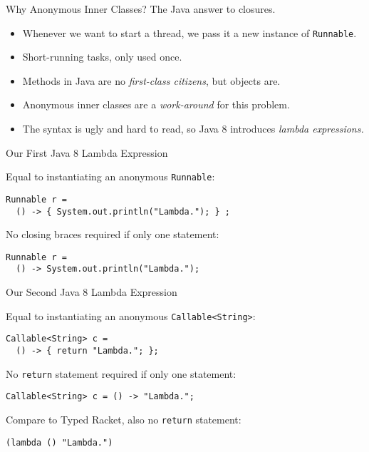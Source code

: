 \documentclass{beamer}
\begin{document}
\begin{frame}[fragile]{Why Anonymous Inner Classes?}
  The Java answer to closures.

  \begin{itemize}
  \pause{} \item Whenever we want to start a thread, we pass it a new instance of \lstinline{Runnable}.
  \pause{} \item Short-running tasks, only used once.
  \pause{} \item Methods in Java are no \emph{first-class citizens}, but objects are.
  \pause{} \item Anonymous inner classes are a \emph{work-around} for this problem.
  \pause{} \item The syntax is ugly and hard to read, so Java 8 introduces \emph{lambda expressions.}
  \end{itemize}
\end{frame}

\begin{frame}[fragile]{Our First Java 8 Lambda Expression}

Equal to instantiating an anonymous \lstinline{Runnable}:
\begin{lstlisting}
Runnable r =
  () -> { System.out.println("Lambda."); } ;
\end{lstlisting}

\pause{} \vspace{0.5cm} No closing braces required if only one statement:
\begin{lstlisting}
Runnable r =
  () -> System.out.println("Lambda.");
\end{lstlisting}
\end{frame}

\begin{frame}[fragile]{Our Second Java 8 Lambda Expression}

Equal to instantiating an anonymous \lstinline{Callable<String>}:
\begin{lstlisting}
Callable<String> c =
  () -> { return "Lambda."; };
\end{lstlisting}

\pause{} \vspace{0.5cm} No \lstinline{return} statement required if only one statement:
\begin{lstlisting}
Callable<String> c = () -> "Lambda.";
\end{lstlisting}

\pause{} \vspace{0.5cm} Compare to Typed Racket, also no \lstinline{return} statement:
\begin{lstlisting}[style=Racket]
(lambda () "Lambda.")
\end{lstlisting}
\end{frame}
\end{document}

